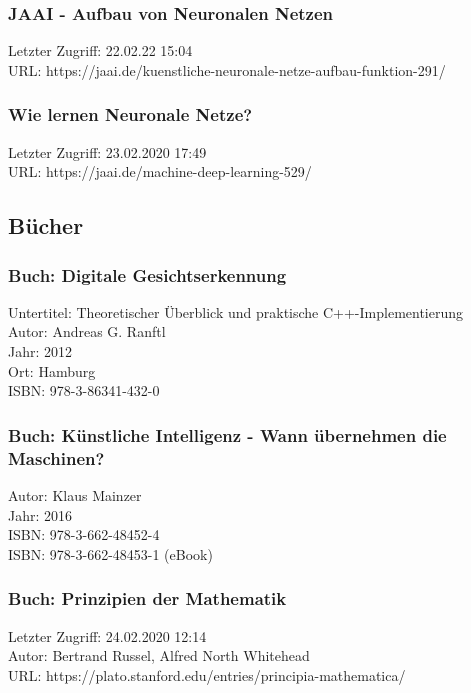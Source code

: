 		\subsubsection{JAAI - Aufbau von Neuronalen Netzen}
		\label{subsubsec:Aufbau_von_Neuronalen_Netzen}
		Letzter Zugriff: 22.02.22 15:04\\
		URL: https://jaai.de/kuenstliche-neuronale-netze-aufbau-funktion-291/

		\subsubsection{Wie lernen Neuronale Netze?}
		\label{subsubsec:Wie_lernen_neuronale_netze}
		Letzter Zugriff: 23.02.2020 17:49\\
		URL: https://jaai.de/machine-deep-learning-529/

\subsection{Bücher}
\label{books}

	\subsubsection{Buch: Digitale Gesichtserkennung}
	\label{book:DigitalGesichtserkennung}
		Untertitel: Theoretischer Überblick und praktische C++-Implementierung\\
		Autor: Andreas G. Ranftl\\
		Jahr: 2012\\
		Ort: Hamburg\\
		ISBN: 978-3-86341-432-0\\

	\subsubsection{Buch: Künstliche Intelligenz - Wann übernehmen die Maschinen?}
	\label{book:KI_WannUebernehmenDieMaschinen}
		Autor: Klaus Mainzer\\
		Jahr: 2016\\
		ISBN: 978-3-662-48452-4\\
		ISBN: 978-3-662-48453-1 (eBook)

	\subsubsection{Buch: Prinzipien der Mathematik}
	\label{book:prinzipa_of_mathmatics}
		Letzter Zugriff: 24.02.2020 12:14\\
		Autor: Bertrand Russel, Alfred North Whitehead\\
		URL: https://plato.stanford.edu/entries/principia-mathematica/

